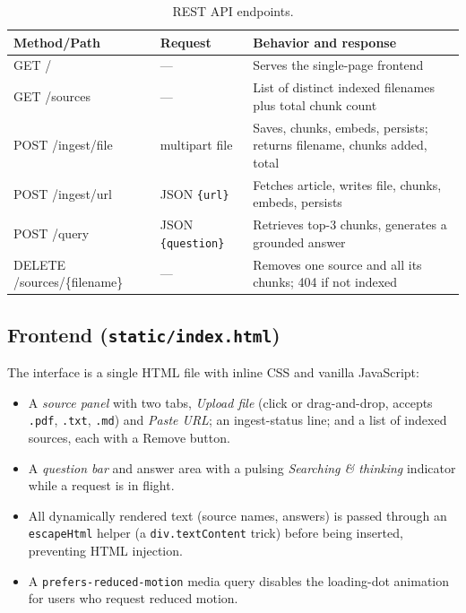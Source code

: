\documentclass[11pt,a4paper]{article}
\newcommand{\code}[1]{\texttt{#1}}
\begin{document}
\begin{table}[h]
\centering
\small
\begin{tabular}{>{\ttfamily}p{2.6cm} p{4.8cm} p{7.4cm}}
\toprule
\textbf{Method/Path} & \textbf{Request} & \textbf{Behavior and response} \\
\midrule
GET /                & --- & Serves the single-page frontend \\
GET /sources         & --- & List of distinct indexed filenames plus total chunk count \\
POST /ingest/file    & multipart file & Saves, chunks, embeds, persists; returns filename, chunks added, total \\
POST /ingest/url     & JSON \texttt{\{url\}} & Fetches article, writes file, chunks, embeds, persists \\
POST /query          & JSON \texttt{\{question\}} & Retrieves top-3 chunks, generates a grounded answer \\
DELETE /sources/\{filename\} & --- & Removes one source and all its chunks; 404 if not indexed \\
\bottomrule
\end{tabular}
\caption{REST API endpoints.}
\label{tab:api}
\end{table}

\subsection{Frontend (\code{static/index.html})}
The interface is a single HTML file with inline CSS and vanilla JavaScript:
\begin{itemize}
  \item A \emph{source panel} with two tabs, \emph{Upload file} (click or
        drag-and-drop, accepts \code{.pdf}, \code{.txt}, \code{.md}) and
        \emph{Paste URL}; an ingest-status line; and a list of indexed
        sources, each with a Remove button.
  \item A \emph{question bar} and answer area with a pulsing
        \emph{Searching \& thinking} indicator while a request is in flight.
  \item All dynamically rendered text (source names, answers) is passed
        through an \code{escapeHtml} helper (a \code{div.textContent} trick)
        before being inserted, preventing HTML injection.
  \item A \code{prefers-reduced-motion} media query disables the loading-dot
        animation for users who request reduced motion.
\end{itemize}
\end{document}
